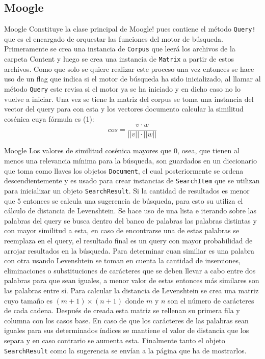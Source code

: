 \subsection{Moogle}
\begin{frame}[fragile]{Moogle}
    Constituye la clase principal de Moogle! pues contiene el método \texttt{Query!} que es el encargado de orquestar
las funciones del motor de búsqueda. Primeramente se crea una instancia de \texttt{Corpus} que leerá los archivos de la carpeta
Content y luego se crea una instancia de \texttt{Matrix} a partir de estos archivos. Como que solo se quiere realizar este proceso
una vez entonces se hace uso de un flag que indica si el motor de búsqueda ha sido inicializado, al llamar al método \texttt{Query}
este revisa si el motor ya se ha iniciado y en dicho caso no lo vuelve a iniciar. Una vez se tiene la matriz del corpus se toma una
instancia del vector del query para con esta y los vectores documento calcular la similitud cosénica cuya fórmula es (1):
\begin{equation}
    cos = \frac{v \cdot w}{||v|| \cdot ||w||}
\end{equation}\newline
\end{frame}
\begin{frame}[fragile]{Moogle}
Los valores de similitud cosénica mayores que 0, osea, que tienen al menos una relevancia mínima para la búsqueda, son guardados en un
diccionario que toma como llaves los objetos \texttt{Document}, el cual posteriormente se ordena descendientemente y es usado para crear
instancias de \texttt{SearchItem} que se utilizan para inicializar un objeto \texttt{SearchResult}. Si la cantidad de resultados es menor
que 5 entonces se calcula una sugerencia de búsqueda, para esto su utiliza el cálculo de distancia de Levenshtein. Se hace uso de una lista e
iterando sobre las palabras del query se busca dentro del banco de palabras las palabras distintas y con mayor similitud a esta, en caso de encontrarse
una de estas palabras se reemplaza en el query, el resultado final es un query con mayor probabilidad de arrojar resultados en la búsqueda. Para determinar
cuan similiar es una palabra con otra usando Levenshtein se toman en cuenta la cantidad de inserciones, eliminaciones o substituciones de carácteres que
se deben llevar a cabo entre dos palabras para que sean iguales, a menor valor de estas entonces más similares son las palabras entre sí. Para calcular
la distancia de Levenshtein se crea una matriz cuyo tamaño es $(m + 1)\times (n + 1)$ donde $m$ y $n$ son el número de carácteres de cada cadena. Después
de creada esta matriz se rellenan su primera fila y columna con los casos base. En caso de que los carácteres de las palabras sean iguales para sus determinados índices se mantiene el valor de distancia que los separa y en caso contrario se aumenta esta. Finalmente tanto el objeto \texttt{SearchResult}
como la sugerencia se envían a la página que ha de mostrarlos.
\end{frame}






